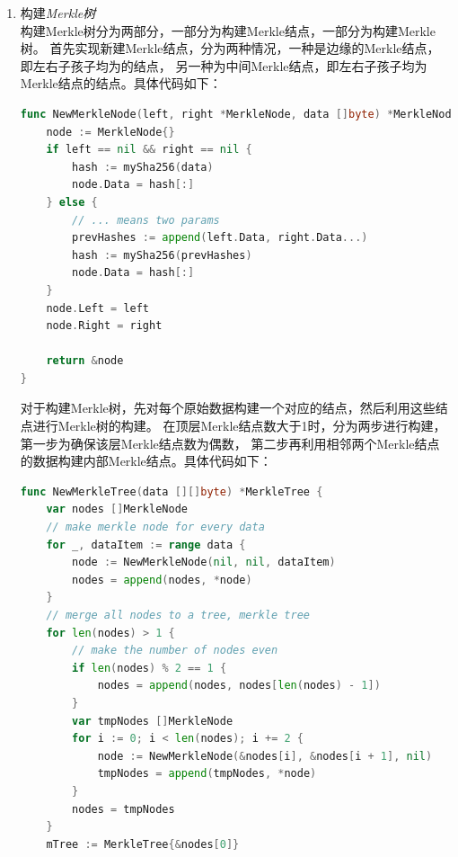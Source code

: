 \documentclass{article}
\begin{document}
\begin{enumerate}
\begin{lstlisting}[language=go]
        a := h0
        b := h1
        c := h2
        d := h3
        e := h4
        f := h5
        g := h6
        h := h7
        for i := 0; i < 64; i++ {
            t1 := h + Sigma1(e) + ch(e, f, g) + k[i] + w[i]
            t2 := Sigma0(a) + maj(a, b, c)
            h = g
            g = f
            f = e
            e = d + t1
            d = c
            c = b
            b = a
            a = t1 + t2
        }
        h0 = a + h0
        h1 = b + h1
        h2 = c + h2
        h3 = d + h3
        h4 = e + h4
        h5 = f + h5
        h6 = g + h6
        h7 = h + h7
    }
    h := []uint32{h0, h1, h2, h3, h4, h5, h6, h7}
    for i := 0; i < 8; i++ {
        binary.BigEndian.PutUint32(sha256data[i * 4: (i + 1) * 4], h[i])
    }

    return sha256data
}
    \end{lstlisting}
    \item 构建\emph{Merkle树}\\
    构建Merkle树分为两部分，一部分为构建Merkle结点，一部分为构建Merkle树。
    首先实现新建Merkle结点，分为两种情况，一种是边缘的Merkle结点，即左右子孩子均为的结点，
    另一种为中间Merkle结点，即左右子孩子均为Merkle结点的结点。具体代码如下：\\
    \begin{lstlisting}[language=go]
func NewMerkleNode(left, right *MerkleNode, data []byte) *MerkleNode {
	node := MerkleNode{}
	if left == nil && right == nil {
		hash := mySha256(data)
		node.Data = hash[:]
	} else {
		// ... means two params
		prevHashes := append(left.Data, right.Data...)
		hash := mySha256(prevHashes)
		node.Data = hash[:]
	}
	node.Left = left
	node.Right = right

	return &node
}
    \end{lstlisting}
    对于构建Merkle树，先对每个原始数据构建一个对应的结点，然后利用这些结点进行Merkle树的构建。
    在顶层Merkle结点数大于1时，分为两步进行构建，第一步为确保该层Merkle结点数为偶数，
    第二步再利用相邻两个Merkle结点的数据构建内部Merkle结点。具体代码如下：\\
    \begin{lstlisting}[language=go]
func NewMerkleTree(data [][]byte) *MerkleTree {
    var nodes []MerkleNode
    // make merkle node for every data
    for _, dataItem := range data {
        node := NewMerkleNode(nil, nil, dataItem)
        nodes = append(nodes, *node)
    }
    // merge all nodes to a tree, merkle tree
    for len(nodes) > 1 {
        // make the number of nodes even
        if len(nodes) % 2 == 1 {
            nodes = append(nodes, nodes[len(nodes) - 1])
        }
        var tmpNodes []MerkleNode
        for i := 0; i < len(nodes); i += 2 {
            node := NewMerkleNode(&nodes[i], &nodes[i + 1], nil)
            tmpNodes = append(tmpNodes, *node)
        }
        nodes = tmpNodes
    }
    mTree := MerkleTree{&nodes[0]}


\end{lstlisting}
\end{enumerate}
\end{document}
